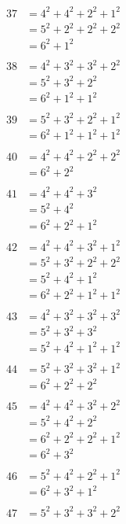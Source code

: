 \documentclass{article}
\numberwithin{equation}{section}
\begin{document}
\begin{multicols}{3}
\noindent
\begin{align*}
37 & = 4^2 + 4^2 + 2^2 + 1^2\\
   & = 5^2 + 2^2 + 2^2 + 2^2\\
   & = 6^2 + 1^2\\
\\
38 & = 4^2 + 3^2 + 3^2 + 2^2\\
   & = 5^2 + 3^2 + 2^2\\
   & = 6^2 + 1^2 + 1^2\\
\\
39 & = 5^2 + 3^2 + 2^2 + 1^2\\
   & = 6^2 + 1^2 + 1^2 + 1^2\\
\\
40 & = 4^2 + 4^2 + 2^2 + 2^2\\
   & = 6^2 + 2^2\\
\\
41 & = 4^2 + 4^2 + 3^2\\
   & = 5^2 + 4^2\\
   & = 6^2 + 2^2 + 1^2\\
\\
42 & = 4^2 + 4^2 + 3^2 + 1^2\\
   & = 5^2 + 3^2 + 2^2 + 2^2\\
   & = 5^2 + 4^2 + 1^2\\
   & = 6^2 + 2^2 + 1^2 + 1^2\\
\\
43 & = 4^2 + 3^2 + 3^2 + 3^2\\
   & = 5^2 + 3^2 + 3^2\\
   & = 5^2 + 4^2 + 1^2 + 1^2\\
\\
44 & = 5^2 + 3^2 + 3^2 + 1^2\\
   & = 6^2 + 2^2 + 2^2\\
\\
45 & = 4^2 + 4^2 + 3^2 + 2^2\\
   & = 5^2 + 4^2 + 2^2\\
   & = 6^2 + 2^2 + 2^2 + 1^2\\
   & = 6^2 + 3^2\\
\end{align*}
\vspace{\fill}\columnbreak
\begin{align*}
46 & = 5^2 + 4^2 + 2^2 + 1^2\\
   & = 6^2 + 3^2 + 1^2\\
\\
47 & = 5^2 + 3^2 + 3^2 + 2^2\\

\end{align*}
\end{multicols}
\end{document}
